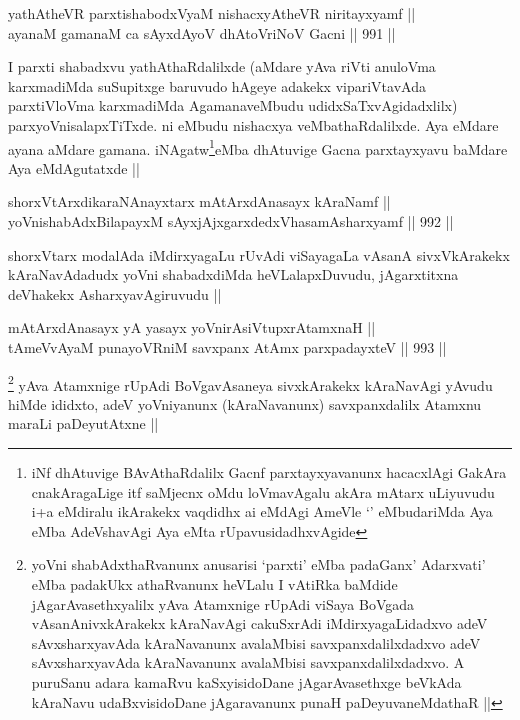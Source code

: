 \begin{shl}
yathAtheVR parxtishabodxV\s yaM nishacxyAtheVR niritayxyamf || \\
ayanaM gamanaM ca sAyxdAyoV dhAtoVriNoV Gacni ||  991 ||  
\end{shl}

\begin{artha}
I parxti shabadxvu yathAthaRdalilxde (aMdare yAva riVti anuloVma karxmadiMda suSupitxge baruvudo hAgeye adakekx vipariVtavAda parxtiVloVma karxmadiMda AgamanaveMbudu udidxSaTxvAgidadxlilx) parxyoVnisalapxTiTxde. ni eMbudu nishacxya veMbathaRdalilxde. Aya eMdare ayana aMdare gamana. iNAgatw\footnote{iNf dhAtuvige BAvAthaRdalilx Gacnf parxtayxyavanunx hacacxlAgi GakAra cnakAragaLige itf saMjecnx oMdu loVmavAgalu akAra mAtarx uLiyuvudu i+a eMdiralu ikArakekx vaqdidhx ai eMdAgi AmeVle `\stext' eMbudariMda Aya eMba AdeVshavAgi Aya eMta rUpavusidadhxvAgide}eMba dhAtuvige Gacna parxtayxyavu baMdare Aya eMdAgutatxde ||
\end{artha}


\begin{shl}
shorxVtArxdikaraNAnayxtarx mAtArxdAnasayx kAraNamf || \\
yoVnishabAdxBilapayxM sAyxjAjxgarxdedxVhasamAsharxyamf ||  992 ||  
\end{shl}

\begin{artha}
shorxVtarx modalAda iMdirxyagaLu rUvAdi viSayagaLa vAsanA sivxVkArakekx kAraNavAdadudx yoVni shabadxdiMda heVLalapxDuvudu, jAgarxtitxna deVhakekx AsharxyavAgiruvudu ||
\end{artha}

\begin{shl}
mAtArxdAnasayx yA yasayx yoVnirAsiVtupxrA\s \s tamxnaH || \\
tAmeVvAyaM punayoVRniM savxpanx AtAmx parxpadayxteV ||  993 ||  
\end{shl}

\begin{artha}
\footnote{yoVni shabAdxthaRvanunx anusarisi `parxti' eMba padaGanx' Adarxvati' eMba padakUkx athaRvanunx heVLalu I vAtiRka baMdide jAgarAvasethxyalilx yAva Atamxnige rUpAdi viSaya BoVgada vAsanAnivxkArakekx kAraNavAgi cakuSxrAdi iMdirxyagaLidadxvo adeV sAvxsharxyavAda kAraNavanunx avalaMbisi savxpanxdalilxdadxvo adeV sAvxsharxyavAda kAraNavanunx avalaMbisi savxpanxdalilxdadxvo. A puruSanu adara kamaRvu kaSxyisidoDane jAgarAvasethxge beVkAda kAraNavu udaBxvisidoDane jAgaravanunx punaH paDeyuvaneMdathaR ||}
yAva Atamxnige rUpAdi BoVgavAsaneya sivxkArakekx kAraNavAgi yAvudu hiMde ididxto, adeV yoVniyanunx (kAraNavanunx) savxpanxdalilx Atamxnu maraLi paDeyutAtxne ||
\end{artha}

